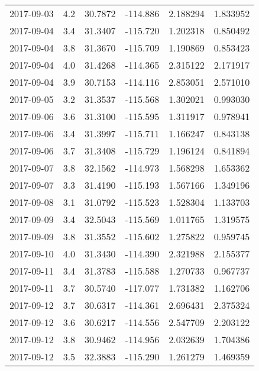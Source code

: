 \begin{tabular}{lrrrrr}
2017-09-03 &       4.2 &  30.7872 &  -114.886 &         2.188294 &         1.833952 \\
2017-09-04 &       3.4 &  31.3407 &  -115.720 &         1.202318 &         0.850492 \\
2017-09-04 &       3.8 &  31.3670 &  -115.709 &         1.190869 &         0.853423 \\
2017-09-04 &       4.0 &  31.4268 &  -114.365 &         2.315122 &         2.171917 \\
2017-09-04 &       3.9 &  30.7153 &  -114.116 &         2.853051 &         2.571010 \\
2017-09-05 &       3.2 &  31.3537 &  -115.568 &         1.302021 &         0.993030 \\
2017-09-06 &       3.6 &  31.3100 &  -115.595 &         1.311917 &         0.978941 \\
2017-09-06 &       3.4 &  31.3997 &  -115.711 &         1.166247 &         0.843138 \\
2017-09-06 &       3.7 &  31.3408 &  -115.729 &         1.196124 &         0.841894 \\
2017-09-07 &       3.8 &  32.1562 &  -114.973 &         1.568298 &         1.653362 \\
2017-09-07 &       3.3 &  31.4190 &  -115.193 &         1.567166 &         1.349196 \\
2017-09-08 &       3.1 &  31.0792 &  -115.523 &         1.528304 &         1.133703 \\
2017-09-09 &       3.4 &  32.5043 &  -115.569 &         1.011765 &         1.319575 \\
2017-09-09 &       3.8 &  31.3552 &  -115.602 &         1.275822 &         0.959745 \\
2017-09-10 &       4.0 &  31.3430 &  -114.390 &         2.321988 &         2.155377 \\
2017-09-11 &       3.4 &  31.3783 &  -115.588 &         1.270733 &         0.967737 \\
2017-09-11 &       3.7 &  30.5740 &  -117.077 &         1.731382 &         1.162706 \\
2017-09-12 &       3.7 &  30.6317 &  -114.361 &         2.696431 &         2.375324 \\
2017-09-12 &       3.6 &  30.6217 &  -114.556 &         2.547709 &         2.203122 \\
2017-09-12 &       3.8 &  30.9462 &  -114.956 &         2.032639 &         1.704386 \\
2017-09-12 &       3.5 &  32.3883 &  -115.290 &         1.261279 &         1.469359 \\

\end{tabular}
